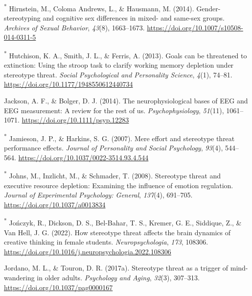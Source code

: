 \documentclass[
  stu, a4paper,floatsintext]{apa7}
\newlength{\cslhangindent}
\newenvironment{CSLReferences}[2] %
 {\begin{list}{}{%
  \setlength{\itemindent}{0pt}
  \setlength{\leftmargin}{0pt}
  \setlength{\parsep}{0pt}
  \ifodd #1
   \setlength{\leftmargin}{\cslhangindent}
   \setlength{\itemindent}{-1\cslhangindent}
  \fi
  \setlength{\itemsep}{#2\baselineskip}}}
 {\end{list}}
\begin{document}
\begin{CSLReferences}{1}{0}
\textsuperscript{*} Hirnstein, M., Coloma Andrews, L., \& Hausmann, M. (2014). Gender-stereotyping and cognitive sex differences in mixed- and same-sex groups. \emph{Archives of Sexual Behavior}, \emph{43}(8), 1663--1673. \url{https://doi.org/10.1007/s10508-014-0311-5}

\textsuperscript{*} Hutchison, K. A., Smith, J. L., \& Ferris, A. (2013). Goals can be threatened to extinction: {Using} the stroop task to clarify working memory depletion under stereotype threat. \emph{Social Psychological and Personality Science}, \emph{4}(1), 74--81. \url{https://doi.org/10.1177/1948550612440734}

Jackson, A. F., \& Bolger, D. J. (2014). The neurophysiological bases of {\textsc{EEG}} and {\textsc{EEG}} measurement: {A} review for the rest of us. \emph{Psychophysiology}, \emph{51}(11), 1061--1071. \url{https://doi.org/10.1111/psyp.12283}

\textsuperscript{*} Jamieson, J. P., \& Harkins, S. G. (2007). Mere effort and stereotype threat performance effects. \emph{Journal of Personality and Social Psychology}, \emph{93}(4), 544--564. \url{https://doi.org/10.1037/0022-3514.93.4.544}

\textsuperscript{*} Johns, M., Inzlicht, M., \& Schmader, T. (2008). Stereotype threat and executive resource depletion: {Examining} the influence of emotion regulation. \emph{Journal of Experimental Psychology: General}, \emph{137}(4), 691--705. \url{https://doi.org/10.1037/a0013834}

\textsuperscript{*} Jończyk, R., Dickson, D. S., Bel-Bahar, T. S., Kremer, G. E., Siddique, Z., \& Van Hell, J. G. (2022). How stereotype threat affects the brain dynamics of creative thinking in female students. \emph{Neuropsychologia}, \emph{173}, 108306. \url{https://doi.org/10.1016/j.neuropsychologia.2022.108306}

Jordano, M. L., \& Touron, D. R. (2017a). Stereotype threat as a trigger of mind-wandering in older adults. \emph{Psychology and Aging}, \emph{32}(3), 307--313. \url{https://doi.org/10.1037/pag0000167}


\end{CSLReferences}
\end{document}
